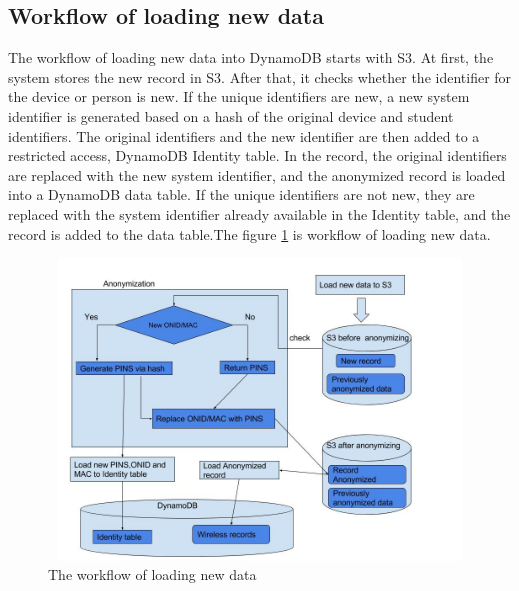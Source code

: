  \subsection{Workflow of loading new data }
 	The workflow of loading new data into DynamoDB starts with S3. At first, the system stores the new record in S3. After that, it checks whether the identifier for the device or person is new. If the unique identifiers are new, a new system identifier is generated based on a hash of the original device and student identifiers. The original identifiers and the new identifier are then added to a restricted access, DynamoDB Identity table. In the record, the original identifiers are replaced with the new system identifier, and the anonymized record is loaded into a DynamoDB data table. If the unique identifiers are not new, they are replaced with the system identifier already available in the Identity table, and the record is added to the data table.The figure \ref{fig:2} is workflow of loading new data.
\begin{figure}[H]
 \includegraphics[width=17cm, height=8cm]{8.jpg}
 \centering
 \caption{\label{fig:2}The workflow of loading new data}
 \end{figure}